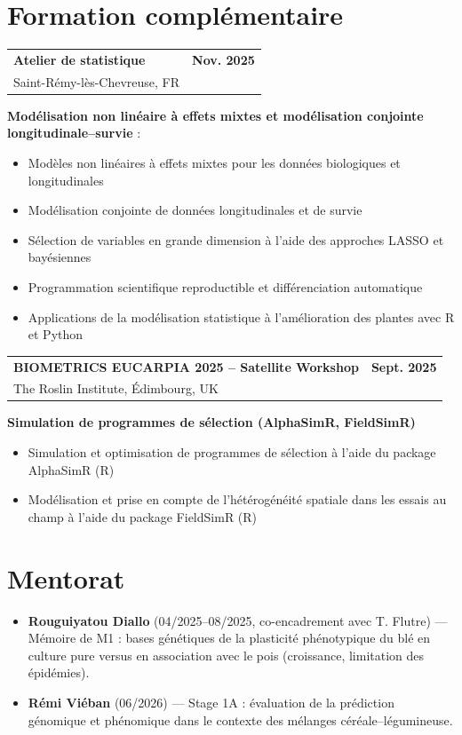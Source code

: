 \documentclass[10pt,a4paper]{article}
\makeatletter
\newcommand{\sizeTitre}{\fontsize{11}{13.2}\selectfont}  %
\newcommand{\sizeDate} {\fontsize{10}{13.2}\selectfont}  %
\newcommand{\sizeOrg}  {\fontsize{10}{12}\selectfont}    %
\newcommand{\sizeLieu} {\fontsize{10}{12}\selectfont}    %
\newcommand{\cventry}[5][2pt]{%
  \par\noindent\begin{tabularx}{\textwidth}{@{}Xr@{}}
    {\sizeTitre\textbf{#2}} & {\sizeDate\textbf{#5}}\\
    {\sizeOrg #3}   & {\sizeLieu #4}\\
  \end{tabularx}\par\vspace{#1}}
\makeatother
\begin{document}
\section{Formation complémentaire}
\cventry{Atelier de statistique}{Saint-Rémy-lès-Chevreuse, FR}{}{Nov. 2025}
\noindent
\textbf{Modélisation non linéaire à effets mixtes et modélisation conjointe longitudinale--survie} : 
  \begin{itemize}[label=\textbullet, itemsep=1pt]
	 \item Modèles non linéaires à effets mixtes pour les données biologiques et longitudinales
	 \item Modélisation conjointe de données longitudinales et de survie
	 \item Sélection de variables en grande dimension à l'aide des approches LASSO et bayésiennes
	 \item Programmation scientifique reproductible et différenciation automatique
	 \item Applications de la modélisation statistique à l'amélioration des plantes avec R et Python
\end{itemize}
\bigskip
\cventry{BIOMETRICS EUCARPIA 2025 -- Satellite Workshop}{The Roslin Institute, Édimbourg, UK}{}{Sept. 2025}
\noindent
\textbf{Simulation de programmes de sélection (AlphaSimR, FieldSimR)}
  \begin{itemize}[label=\textbullet, itemsep=1pt]
  \item Simulation et optimisation de programmes de sélection à l'aide du package AlphaSimR (R)
  \item Modélisation et prise en compte de l'hétérogénéité spatiale dans les essais au champ à l'aide du package FieldSimR (R)
\end{itemize}

\section{Mentorat}
\begin{itemize}[label=\textbullet, itemsep=6pt]
  \item \textbf{Rouguiyatou Diallo} (04/2025--08/2025, co-encadrement avec T. Flutre) --- Mémoire de M1 : bases génétiques de la plasticité phénotypique du blé en culture pure versus en association avec le pois (croissance, limitation des épidémies).
  \item \textbf{Rémi Viéban} (06/2026) --- Stage 1A : évaluation de la prédiction génomique et phénomique dans le contexte des mélanges céréale--légumineuse.
\end{itemize}
\end{document}
